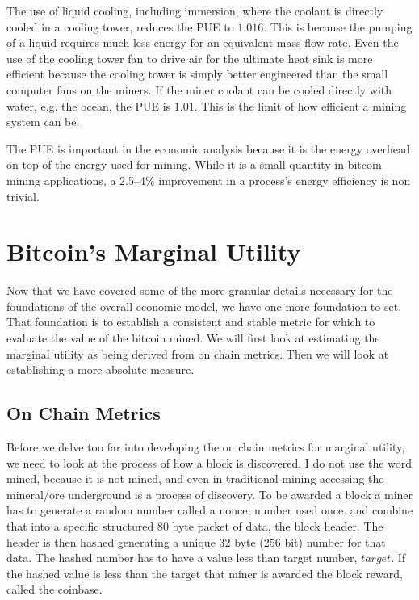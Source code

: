 \documentclass[runningheads]{llncs}
\begin{document}
The use of liquid cooling, including immersion, where the coolant is directly cooled in a cooling tower, reduces the PUE to $1.016$.
This is because the pumping of a liquid requires much less energy for an equivalent mass flow rate.
Even the use of the cooling tower fan to drive air for the ultimate heat sink is more efficient because the cooling tower is simply better engineered than the small computer fans on the miners.
If the miner coolant can be cooled directly with water, e.g. the ocean, the PUE is $1.01$.
This is the limit of how efficient a mining system can be.

The PUE is important in the economic analysis because it is the energy overhead on top of the energy used for mining.
While it is a small quantity in bitcoin mining applications, a 2.5--4\% improvement in a process's energy efficiency is non trivial.

\section{Bitcoin's Marginal Utility}
Now that we have covered some of the more granular details necessary for the foundations of the overall economic model, we have one more foundation to set.
That foundation is to establish a consistent and stable metric for which to evaluate the value of the bitcoin mined.
We will first look at estimating the marginal utility as being derived from on chain metrics.
Then we will look at establishing a more absolute measure.

\subsection{On Chain Metrics}
Before we delve too far into developing the on chain metrics for marginal utility, we need to look at the process of how a block is discovered.
I do not use the word mined, because it is not mined, and even in traditional mining accessing the mineral/ore underground is a process of discovery.
To be awarded a block a miner has to generate a random number called a nonce, number used once. and combine that into a specific structured 80 byte packet of data, the block header.
The header is then hashed generating a unique 32 byte (256 bit) number for that data.
The hashed number has to have a value less than target number, $target$.
If the hashed value is less than the target that miner is awarded the block reward, called the coinbase.
\end{document}

